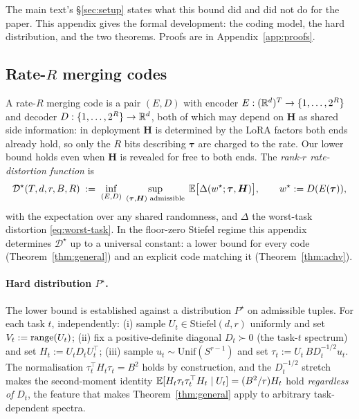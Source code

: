 The main text's \S\ref{sec:setup} states what this bound did and did not do
for the paper. This appendix gives the formal development: the coding model,
the hard distribution, and the two theorems. Proofs are in
Appendix~\ref{app:proofs}.

\subsection{Rate-\texorpdfstring{$R$}{R} merging codes}
\label{app:rd-codes}

A rate-$R$ merging code is a pair $(E, D)$ with encoder
$E : (\mathbb{R}^d)^T \to \{1,\ldots,2^R\}$ and decoder
$D : \{1,\ldots,2^R\} \to \mathbb{R}^d$, both of which may depend on
$\boldsymbol H$ as shared side information: in deployment $\boldsymbol H$ is
determined by the LoRA factors both ends already hold, so only the $R$ bits
describing $\boldsymbol\tau$ are charged to the rate. Our lower bound holds
even when $\boldsymbol H$ is revealed for free to both ends. The
\emph{rank-$r$ rate-distortion function} is
\begin{equation}\label{eq:rd-def}
  \mathcal{D}^\star(T, d, r, B, R)
  \;:=\; \inf_{(E, D)}\;\sup_{(\boldsymbol\tau, \boldsymbol H)
    \text{ admissible}}\;
  \mathbb{E}\bigl[\Delta(w^\star;\boldsymbol\tau, \boldsymbol H)\bigr],
  \qquad w^\star := D(E(\boldsymbol\tau)),
\end{equation}
with the expectation over any shared randomness, and $\Delta$ the worst-task
distortion \eqref{eq:worst-task}. In the floor-zero Stiefel regime this
appendix determines $\mathcal{D}^\star$ up to a universal constant: a lower
bound for every code (Theorem~\ref{thm:general}) and an explicit code matching
it (Theorem~\ref{thm:achv}).

\paragraph{Hard distribution $P^\star$.} The lower bound is established
against a distribution $P^\star$ on admissible tuples. For each task
$t$, independently: (i) sample $U_t \in \mathrm{Stiefel}(d, r)$
uniformly and set $V_t := \operatorname{range}(U_t)$; (ii) fix a positive-definite
diagonal $D_t \succ 0$ (the task-$t$ spectrum) and set $H_t := U_t D_t
U_t^\top$; (iii) sample $u_t \sim \mathrm{Unif}(S^{r-1})$ and set
$\tau_t := U_t\, B D_t^{-1/2} u_t$. The normalisation
$\tau_t^\top H_t \tau_t = B^2$ holds by construction, and the
$D_t^{-1/2}$ stretch makes the second-moment identity
$\mathbb{E}[H_t \tau_t \tau_t^\top H_t \mid U_t] = (B^2/r) H_t$ hold
\emph{regardless of} $D_t$, the feature that makes
Theorem~\ref{thm:general} apply to arbitrary task-dependent spectra.

